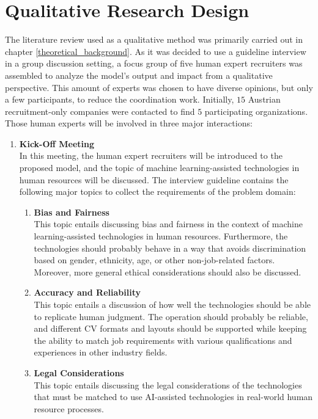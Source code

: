 \documentclass[draft,final]{thesisclass} %
\begin{document}
\section{Qualitative Research Design} \label{qualitative_research_design}
The literature review used as a qualitative method was primarily carried out in chapter \ref{theoretical_background}.
As it was decided to use a guideline interview in a group discussion setting, a focus group of five human expert recruiters was assembled to analyze the model's output and impact from a qualitative perspective.
This amount of experts was chosen to have diverse opinions, but only a few participants, to reduce the coordination work.
Initially, $15$ Austrian recruitment-only companies were contacted to find $5$ participating organizations.
Those human experts will be involved in three major interactions:
\begin{enumerate}
    \item \textbf{Kick-Off Meeting} \label{kick_off_meeting}\\
    In this meeting, the human expert recruiters will be introduced to the proposed model, and the topic of machine learning-assisted technologies in human resources will be discussed.
    The interview guideline contains the following major topics to collect the requirements of the problem domain:
    \begin{enumerate}
        \item \textbf{Bias and Fairness}\\
        This topic entails discussing bias and fairness in the context of machine learning-assisted technologies in human resources.
        Furthermore, the technologies should probably behave in a way that avoids discrimination based on gender, ethnicity, age, or other non-job-related factors.
        Moreover, more general ethical considerations should also be discussed.
        \item \textbf{Accuracy and Reliability}\\
        This topic entails a discussion of how well the technologies should be able to replicate human judgment.
        The operation should probably be reliable, and different \acs{CV} formats and layouts should be supported while keeping the ability to match job requirements with various qualifications and experiences in other industry fields.
        \item \textbf{Legal Considerations}\\
        This topic entails discussing the legal considerations of the technologies that must be matched to use \acs{AI}-assisted technologies in real-world human resource processes.

\end{enumerate}
\end{enumerate}
\end{document}

